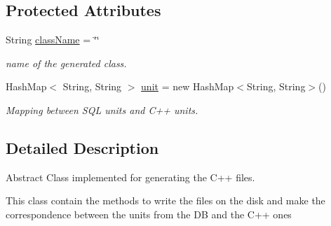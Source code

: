 \subsection*{Protected Attributes}
\begin{DoxyCompactItemize}
\item 
\hypertarget{class_classes_c_p_p_1_1_class_generator_afdefd7e06ee9c818e2d3d367bed59bc1}{
String \hyperlink{class_classes_c_p_p_1_1_class_generator_afdefd7e06ee9c818e2d3d367bed59bc1}{className} = \char`\"{}\char`\"{}}
\label{class_classes_c_p_p_1_1_class_generator_afdefd7e06ee9c818e2d3d367bed59bc1}

\begin{DoxyCompactList}\small\item\em name of the generated class. \end{DoxyCompactList}\item 
\hypertarget{class_classes_c_p_p_1_1_class_generator_ae42121bfdd264575455ea05f08180020}{
HashMap$<$ String, String $>$ \hyperlink{class_classes_c_p_p_1_1_class_generator_ae42121bfdd264575455ea05f08180020}{unit} = new HashMap$<$String, String$>$()}
\label{class_classes_c_p_p_1_1_class_generator_ae42121bfdd264575455ea05f08180020}

\begin{DoxyCompactList}\small\item\em Mapping between SQL units and C++ units. \end{DoxyCompactList}\end{DoxyCompactItemize}


\subsection{Detailed Description}
Abstract Class implemented for generating the C++ files. 

This class contain the methods to write the files on the disk and make the correspondence between the units from the DB and the C++ ones 

